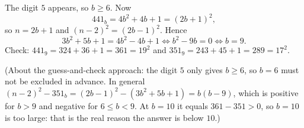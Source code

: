 The digit $5$ appears, so $b\ge6$. Now
\[441_b=4b^2+4b+1=(2b+1)^2,\]
so $n=2b+1$ and $(n-2)^2=(2b-1)^2$. Hence
\[3b^2+5b+1=4b^2-4b+1\iff b^2-9b=0\iff b=\boxed{9}.\]
Check: $441_9=324+36+1=361=19^2$ and $351_9=243+45+1=289=17^2$.

(About the guess-and-check approach: the digit $5$ only gives $b\ge6$, so $b=6$ must not be excluded in advance. In general $(n-2)^2-351_b=(2b-1)^2-\left(3b^2+5b+1\right)=b(b-9)$, which is positive for $b>9$ and negative for $6\le b<9$. At $b=10$ it equals $361-351>0$, so $b=10$ is too large: that is the real reason the answer is below $10$.)
